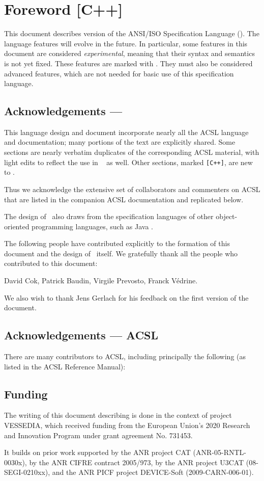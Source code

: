 \thispagestyle{plain}
\chapter*{Foreword [C++]}

This document describes version \acslppversion{}
of the ANSI/ISO \lang Specification Language (\NAME).
The language features will evolve in the future.
In particular, some features in this document
are considered \emph{experimental}, meaning that their syntax and
semantics is not yet fixed.
These features are marked with
\experimental.
They must also be considered advanced features,
which are not needed for basic use of this
specification language.

\section*{Acknowledgements --- \NAME}

This language design and document incorporate nearly all the
ACSL language and documentation; many portions of the text
are explicitly shared.
Some sections are nearly verbatim
duplicates of the corresponding ACSL material, with light edits
to reflect the use in \NAME~ as well.
Other sections, marked \texttt{[C++]}, are new to \NAME.

Thus we acknowledge the extensive
set of collaborators and commenters on ACSL that are listed
in the companion ACSL documentation and replicated below.

The design of \NAME~also draws from the specification
languages of other object-oriented programming languages,
such as Java \cite{leavens00jml}.

The following people have contributed explicitly to the formation of
this document and the design of \NAME~itself.
We gratefully thank all the people who contributed to this document:

David Cok,
Patrick Baudin,
Virgile Prevosto,
Franck Védrine.

We also wish to thank Jens Gerlach for his feedback on the first version
of the document.

\section*{Acknowledgements --- ACSL}
There are many contributors to ACSL, including principally the following
(as listed in the ACSL Reference Manual):


\section*{Funding}
The writing of this document describing \NAME is done in the context of
project VESSEDIA,
which  received funding from the European Union's 2020
Research and Innovation Program under grant agreement
No. 731453.

It builds on prior work supported by the ANR project CAT
(ANR-05-RNTL-0030x), by the ANR CIFRE contract 2005/973,
by the ANR project U3CAT (08-SEGI-0210xx), and the ANR PICF
project DEVICE-Soft (2009-CARN-006-01).
